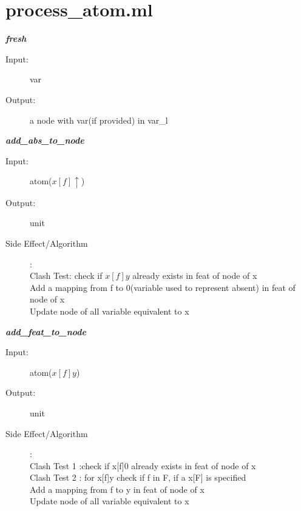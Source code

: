 \documentclass[12pt]{article}
\begin{document}
\section{process\_atom.ml}
\begin{description}

\item \textbf{\textit{fresh}}
\begin{description}
    \item[Input:] var
    \item[Output:] a node with var(if provided) in var\_l
\end{description}


\item \textbf{\textit{add\_abs\_to\_node}}
\begin{description}
    \item[Input:] atom($x[f]\uparrow$)
    \item[Output:] unit
    \item[Side Effect/Algorithm]:\\Clash Test: check if $x[f]y$ already exists in feat of node of x\\
	Add a mapping from f to 0(variable used to represent absent) in feat of node of x\\
	Update node of all variable equivalent to x\\
\end{description}

\item \textbf{\textit{add\_feat\_to\_node}}
\begin{description}
    \item[Input:] atom($x[f]y$)
    \item[Output:] unit
    \item[Side Effect/Algorithm]:\\Clash Test 1 :check if x[f]0 already exists in feat of node of x\\
	Clash Test 2 : for x[f]y check if f in F, if a x[F] is specified\\
	Add a mapping from f to y in feat of node of x\\
	Update node of all variable equivalent to x\\
\end{description}



\end{description}
\end{document}
